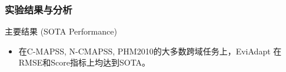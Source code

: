 \documentclass{beamer}
\begin{document}
\begin{frame}
    \frametitle{实验结果与分析}
    \begin{block}{主要结果 (SOTA Performance)}
        \begin{itemize}
            \item 在C-MAPSS, N-CMAPSS, PHM2010的大多数跨域任务上，EviAdapt 在RMSE和Score指标上均达到SOTA。

\end{itemize}
\end{block}
\end{frame}
\end{document}
